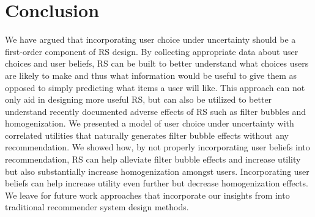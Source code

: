 \documentclass[sigconf]{acmart}
\begin{document}
\section{Conclusion}

We have argued that incorporating user choice under uncertainty should be a first-order component of RS design. By collecting appropriate data about user choices and user beliefs, RS can be built to better understand what choices users are likely to make and thus what information would be useful to give them as opposed to simply predicting what items a user will like. This approach can not only aid in designing more useful RS, but can also be utilized to better understand recently documented adverse effects of RS such as filter bubbles and homogenization. We presented a model of user choice under uncertainty with correlated utilities that naturally generates filter bubble effects without any recommendation. We showed how, by not properly incorporating user beliefs into recommendation, RS can help alleviate filter bubble effects and increase utility but also substantially increase homogenization amongst users. Incorporating user beliefs can help increase utility even further but decrease homogenization effects. We leave for future work approaches that incorporate our insights from into traditional recommender system design methods.



\end{document}
